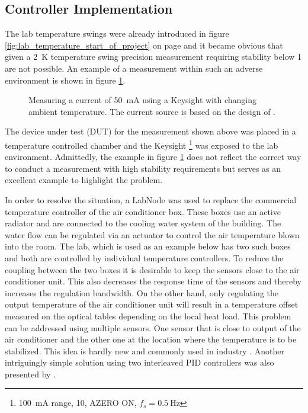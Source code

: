 \subsection{Controller Implementation}
The lab temperature swings were already introduced in figure \ref{fig:lab_temperature_start_of_project} on page \pageref{fig:lab_temperature_start_of_project} and it became obvious that given a \qty{2}{\kelvin} temperature swing precision measurement requiring stability below \qty{1}{\ppm} are not possible. An example of a measurement within such an adverse environment is shown in figure \ref{fig:laser_driver_aircon}.
\begin{figure}[ht]
    \centering
    \caption{Measuring a current of \qty{50}{\mA} using a Keysight  with changing ambient temperature. The current source is based on the design of \citeauthor{laser_driver_digital} \cite{laser_driver_digital}.}
    \label{fig:laser_driver_aircon}
\end{figure}

The device under test (DUT) for the measurement shown above was placed in a temperature controlled chamber and the Keysight \footnote{\qty{100}{\mA} range, \qty{10}{\plc}, AZERO ON, $f_s = \qty{0.5}{\Hz}$} was exposed to the lab environment. Admittedly, the example in figure \ref{fig:laser_driver_aircon} does not reflect the correct way to conduct a measurement with high stability requirements but serves as an excellent example to highlight the problem.

In order to resolve the situation, a LabNode was used to replace the commercial temperature controller of the air conditioner box. These boxes use an active radiator and are connected to the cooling water system of the building. The water flow can be regulated via an actuator to control the air temperature blown into the room. The lab, which is used as an example below has two such boxes and both are controlled by individual temperature controllers. To reduce the coupling between the two boxes it is desirable to keep the sensors close to the air conditioner unit. This also decreases the response time of the sensors and thereby increases the regulation bandwidth. On the other hand, only regulating the output temperature of the air conditioner unit will result in a temperature offset measured on the optical tables depending on the local heat load. This problem can be addressed using multiple sensors. One sensor that is close to output of the air conditioner and the other one at the location where the temperature is to be stabilized. This idea is hardly new and commonly used in industry \cite{multi_sensor_pid}. Another intriguingly simple solution using two interleaved PID controllers was also presented by \citeauthor{split_pid} \cite{split_pid}.

